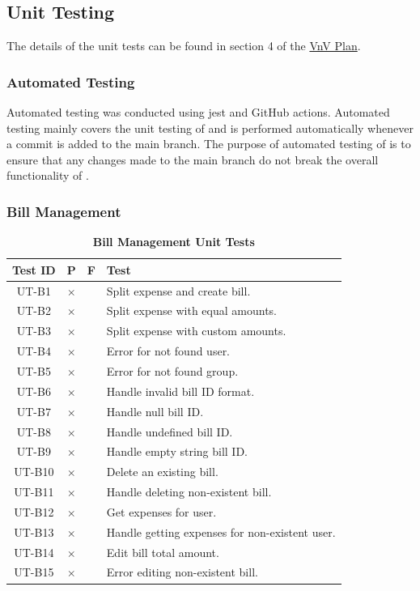 \documentclass[12pt, titlepage]{article}
\begin{document}
\subsection{Unit Testing}

The details of the unit tests can be found in section 4 of the \href{https://github.com/DangJustin/CapstoneProject/blob/main/docs/VnVPlan/VnVPlan.pdf}{VnV Plan}.

\subsubsection{Automated Testing}

Automated testing was conducted using jest and GitHub actions. Automated testing mainly covers the unit testing of \progname{} and is performed automatically whenever a commit is added to the main branch. The purpose of automated testing of \progname{} is to ensure that any changes made to the main branch do not break the overall functionality of \progname{}.

\subsubsection{Bill Management}

\begin{table}[H]
\centering
\begin{tabular}{|c|c|c|p{5cm}|}
\hline
Test ID & P & F & Test\\
\hline 
UT-B1 & $\times$ & & Split expense and create bill.\\
\hline 
UT-B2 & $\times$ & & Split expense with equal amounts.\\
\hline 
UT-B3 & $\times$ & & Split expense with custom amounts.\\
\hline 
UT-B4 & $\times$ & & Error for not found user.\\
\hline 
UT-B5 & $\times$ & & Error for not found group.\\
\hline 
UT-B6 & $\times$ & & Handle invalid bill ID format.\\
\hline 
UT-B7 & $\times$ & & Handle null bill ID.\\
\hline 
UT-B8 & $\times$ & & Handle undefined bill ID.\\
\hline 
UT-B9 & $\times$ & & Handle empty string bill ID.\\
\hline 
UT-B10 & $\times$ & & Delete an existing bill.\\
\hline 
UT-B11 & $\times$ & & Handle deleting non-existent bill.\\
\hline 
UT-B12 & $\times$ & & Get expenses for user.\\
\hline 
UT-B13 & $\times$ & & Handle getting expenses for non-existent user.\\
\hline 
UT-B14 & $\times$ & & Edit bill total amount.\\
\hline 
UT-B15 & $\times$ & & Error editing non-existent bill.\\
\hline
\end{tabular}
\caption{\bf Bill Management Unit Tests}
\end{table}
\end{document}

